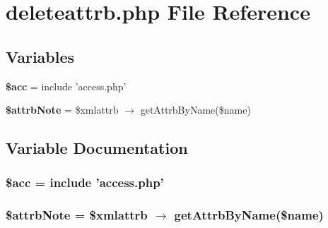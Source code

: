\section{deleteattrb.php File Reference}
\label{deleteattrb_8php}


\subsection*{Variables}
\begin{CompactItemize}
\item 
{\bf \$acc} = include 'access.php'
\item 
{\bf \$attrb\-Note} = \$xmlattrb $\rightarrow$ get\-Attrb\-By\-Name(\$name)
\end{CompactItemize}


\subsection{Variable Documentation}
\subsubsection{\setlength{\rightskip}{0pt plus 5cm}\$acc = include 'access.php'}\label{deleteattrb_8php_542926c588a05eb69553d79c83cf73da}


\subsubsection{\setlength{\rightskip}{0pt plus 5cm}\$attrb\-Note = \$xmlattrb $\rightarrow$ get\-Attrb\-By\-Name(\$name)}\label{deleteattrb_8php_da7a2988da22b86a954a27a8d1f68a5f}


